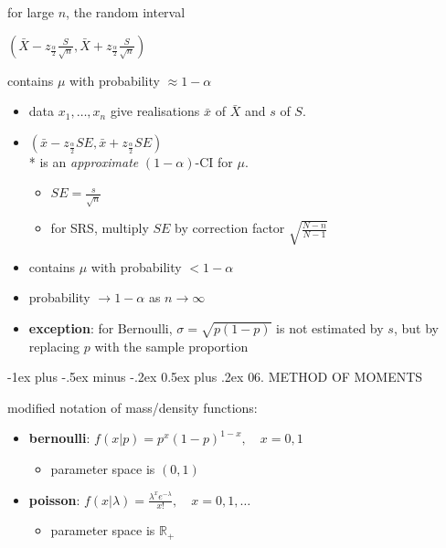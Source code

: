 \documentclass[10pt, landscape]{article}
\makeatletter
\renewcommand{\section}{\@startsection{section}{1}{0mm}%
  {-1ex plus -.5ex minus -.2ex}%
  {0.5ex plus .2ex}%
{\normalfont\large\bfseries}}
\newcommand{\xbar}{\bar{x}}
\newcommand{\Xbar}{\bar{X}}
\newcommand{\seq}[2][n]{#2_1, \dots, #2_{#1}}
\makeatother
\begin{document}
\begin{multicols*}{4}
  \begin{tightcenter}
    for large $n$, the random interval

    \( {\displaystyle{ \left( \Xbar-z_{\frac{\alpha}{2}}\frac{S}{\sqrt n}, \Xbar+z_{\frac{\alpha}{2}}\frac{S}{\sqrt n} \right) }} \) 

    contains $\mu$ with probability $\approx 1-\alpha$
  \end{tightcenter}

  \begin{itemize}
    \item data $\seq{x}$ give realisations $\xbar$ of $\Xbar$ and $s$ of $S$.
    \item $ \left( \xbar-z_{\frac{\alpha}{2}}SE, \xbar+z_{\frac{\alpha}{2}}SE \right) $ \\* is an \textit{approximate} $(1-\alpha)$-CI for $\mu$.
      \begin{itemize}
        \item $SE = \frac{s}{\sqrt n}$
        \item for SRS, multiply $SE$ by correction factor $\sqrt{\frac{N-n}{N-1}}$
      \end{itemize}
    \item contains $\mu$ with probability $<1-\alpha$
    \item probability $\to 1-\alpha$ as $n \to \infty$
    \item \textbf{exception}: for Bernoulli, $\sigma = \sqrt{p(1-p)}$ is not estimated by $s$, but by replacing $p$ with the sample proportion
  \end{itemize}

  \section{06. METHOD OF MOMENTS}

  modified notation of mass/density functions:

  \begin{itemize}
    \item \textbf{bernoulli}: $f(x\vert p) = p^x (1-p)^{1-x}, \quad x=0,1$
      \begin{itemize}
        \item parameter space is $(0,1)$
      \end{itemize}
    \item \textbf{poisson}: $f(x \vert \lambda) = \frac{\lambda^xe^{-\lambda}}{x!}, \quad x=0,1,\dots$
      \begin{itemize}
        \item parameter space is $\mathbb{R}_+$
      \end{itemize}
  \end{itemize}


\end{multicols*}
\end{document}
